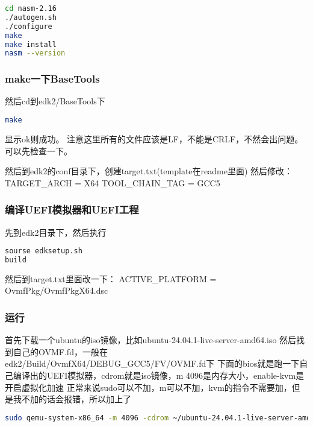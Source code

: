 \begin{lstlisting}[language=bash]
cd nasm-2.16
./autogen.sh
./configure
make
make install
nasm --version
\end{lstlisting}

\subsubsection{make一下BaseTools}

然后cd到edk2/BaseTools下
\begin{lstlisting}[language=bash]
make
\end{lstlisting}

显示ok则成功。
注意这里所有的文件应该是LF，不能是CRLF，不然会出问题。可以先检查一下。

然后到edk2的conf目录下，创建target.txt(template在readme里面)
然后修改：
TARGET_ARCH           = X64
TOOL_CHAIN_TAG        = GCC5

\subsubsection{编译UEFI模拟器和UEFI工程}
先到edk2目录下，然后执行
\begin{lstlisting}[language=bash]
sourse edksetup.sh
build
\end{lstlisting}

然后到target.txt里面改一下：
ACTIVE_PLATFORM       = OvmfPkg/OvmfPkgX64.dsc

\subsubsection{运行}
首先下载一个ubuntu的iso镜像，比如ubuntu-24.04.1-live-server-amd64.iso
然后找到自己的OVMF.fd，一般在edk2/Build/OvmfX64/DEBUG_GCC5/FV/OVMF.fd下
下面的bios就是跑一下自己编译出的UEFI模拟器，cdrom就是iso镜像，m 4096是内存大小，enable-kvm是开启虚拟化加速
正常来说sudo可以不加，m可以不加，kvm的指令不需要加，但是我不加的话会报错，所以加上了
\begin{lstlisting}[language=bash]
sudo qemu-system-x86_64 -m 4096 -cdrom ~/ubuntu-24.04.1-live-server-amd64.iso -bios ~/OVMF.fd -enable-kvm
\end{lstlisting}
